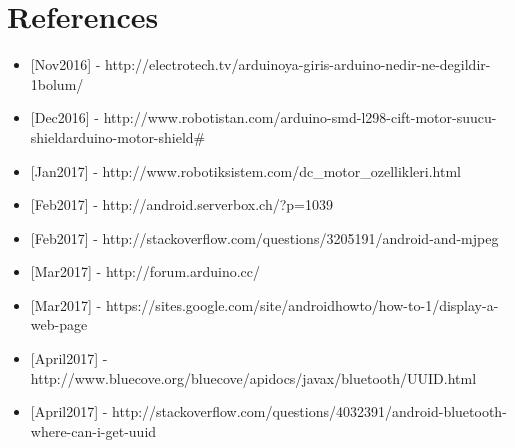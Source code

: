 \documentclass[11pt]{article}
\begin{document}
\pagebreak

\section{References}
\begin{itemize}
\item {[Nov2016] - http://electrotech.tv/arduinoya-giris-arduino-nedir-ne-degildir-1bolum/}
\item {[Dec2016] - http://www.robotistan.com/arduino-smd-l298-cift-motor-suucu-shieldarduino-motor-shield\#}
\item {[Jan2017] - http://www.robotiksistem.com/dc\_motor\_ozellikleri.html}
\item {[Feb2017] - http://android.serverbox.ch/?p=1039}
\item {[Feb2017] - http://stackoverflow.com/questions/3205191/android-and-mjpeg}
\item {[Mar2017] - http://forum.arduino.cc/}
\item {[Mar2017] - https://sites.google.com/site/androidhowto/how-to-1/display-a-web-page}
\item {[April2017] - http://www.bluecove.org/bluecove/apidocs/javax/bluetooth/UUID.html}
\item {[April2017] - http://stackoverflow.com/questions/4032391/android-bluetooth-where-can-i-get-uuid}

\end{itemize}
\end{document}
